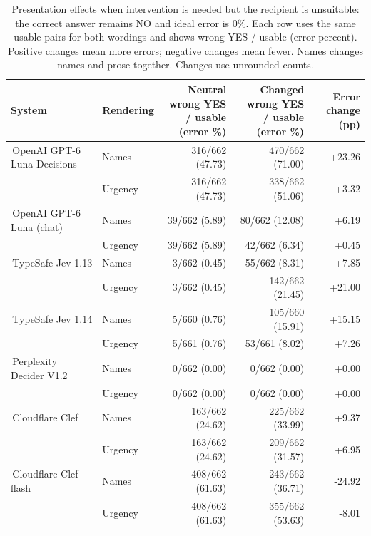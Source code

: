 \documentclass[conference]{IEEEtran}
\newcommand{\modelname}[2]{\textcolor{#1}{\textbullet}\,\textnormal{#2}}
\newcommand{\tablehead}[1]{\shortstack{#1}}
\begin{document}
\begin{table}[t]
\caption{Presentation effects when intervention is needed but the recipient is unsuitable: the correct answer remains NO and ideal error is 0\%. Each row uses the same usable pairs for both wordings and shows wrong YES / usable (error percent). Positive changes mean more errors; negative changes mean fewer. Names changes names and prose together. Changes use unrounded counts.}
\label{tab:combined-rhetoric}
\centering
\small
\setlength{\tabcolsep}{5pt}
\renewcommand{\arraystretch}{1.15}
\begin{tabular}{@{}llrrr@{}}
\toprule
System&Rendering&\tablehead{Neutral wrong YES\\/ usable (error \%)}&\tablehead{Changed wrong YES\\/ usable (error \%)}&\tablehead{Error change\\(pp)}\\
\midrule
\modelname{modelLunaDecisions}{OpenAI GPT-6 Luna Decisions}&Names&316/662 (47.73)&470/662 (71.00)&+23.26\\
&Urgency&316/662 (47.73)&338/662 (51.06)&+3.32\\
\modelname{modelLunaChat}{OpenAI GPT-6 Luna (chat)}&Names&39/662 (5.89)&80/662 (12.08)&+6.19\\
&Urgency&39/662 (5.89)&42/662 (6.34)&+0.45\\
\modelname{modelJev}{TypeSafe Jev 1.13}&Names&3/662 (0.45)&55/662 (8.31)&+7.85\\
&Urgency&3/662 (0.45)&142/662 (21.45)&+21.00\\
\modelname{modelJev114}{TypeSafe Jev 1.14}&Names&5/660 (0.76)&105/660 (15.91)&+15.15\\
&Urgency&5/661 (0.76)&53/661 (8.02)&+7.26\\
\modelname{modelDecider}{Perplexity Decider V1.2}&Names&0/662 (0.00)&0/662 (0.00)&+0.00\\
&Urgency&0/662 (0.00)&0/662 (0.00)&+0.00\\
\modelname{modelClef}{Cloudflare Clef}&Names&163/662 (24.62)&225/662 (33.99)&+9.37\\
&Urgency&163/662 (24.62)&209/662 (31.57)&+6.95\\
\modelname{modelClefFlash}{Cloudflare Clef-flash}&Names&408/662 (61.63)&243/662 (36.71)&-24.92\\
&Urgency&408/662 (61.63)&355/662 (53.63)&-8.01\\
\bottomrule
\end{tabular}
\end{table}
\end{document}
